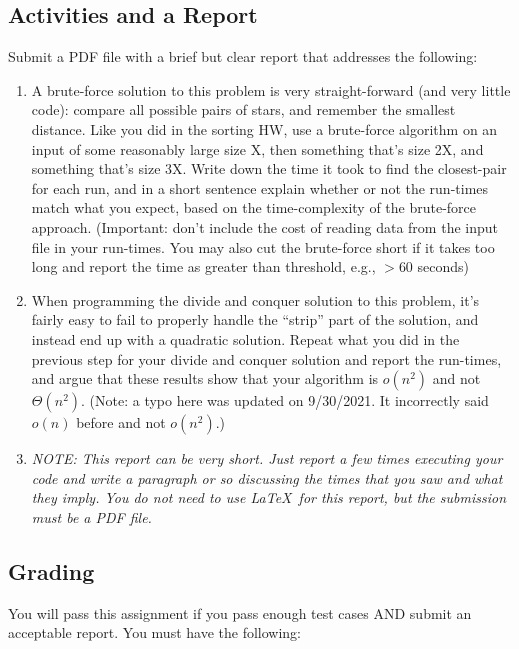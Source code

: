 \documentclass[11pt]{article}
\begin{document}
\subsection*{Activities and a Report}

Submit a PDF file with a brief but clear report that addresses the following:

\begin{enumerate}

\item A brute-force solution to this problem is very straight-forward (and very little code):  compare all possible pairs of stars, and remember the smallest distance. Like you did in the sorting HW, use a brute-force algorithm on an input of some reasonably large size X, then something that's size 2X, and something that's size 3X.  Write down the time it took to find the closest-pair for each run, and in a short sentence explain whether or not the run-times match what you expect, based on the time-complexity of the brute-force approach.  (Important: don't include the cost of reading data from the input file in your run-times. You may also cut the brute-force short if it takes too long and report the time as greater than threshold, e.g., $> 60$ seconds)

\item When programming the divide and conquer solution to this problem, it's fairly easy to fail to properly handle the ``strip'' part of the solution, and instead end up with a quadratic solution.  Repeat what you did in the previous step for your divide and conquer solution and report the run-times, and argue that these results show that your algorithm is $o(n^2)$ and not $\Theta(n^2)$.  (Note: a typo here was updated on 9/30/2021. It incorrectly said $o(n)$ before and not $o(n^2)$.)

\item {\em NOTE: This report can be very short. Just report a few times executing your code and write a paragraph or so discussing the times that you saw and what they imply. You do not need to use \LaTeX\ for this report, but the submission must be a PDF file.}

\end{enumerate}

\subsection*{Grading}

You will pass this assignment if you pass enough test cases AND submit an acceptable report. You must have the following:
\end{document}
